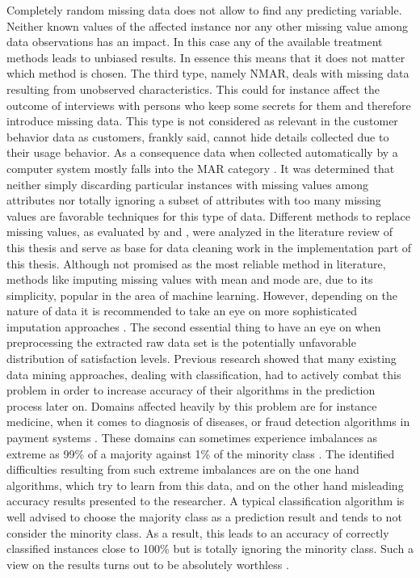 Completely random missing data does not allow to find any predicting variable. Neither known values of the affected instance nor any other missing value among data observations has an impact. In this case any of the available treatment methods leads to unbiased results. In essence this means that it does not matter which method is chosen. The third type, namely NMAR, deals with missing data resulting from unobserved characteristics. This could for instance affect the outcome of interviews with persons who keep some secrets for them and therefore introduce missing data. This type is not considered as relevant in the customer behavior data as customers, frankly said, cannot hide details collected due to their usage behavior. As a consequence data when collected automatically by a computer system mostly falls into the MAR category \cite{donders2006gentle}. It was determined that neither simply discarding particular instances with missing values among attributes nor totally ignoring a subset of attributes with too many missing values are favorable techniques for this type of data. Different methods to replace missing values, as evaluated by \cite{donders2006gentle} and \cite{batista2003analysis}, were analyzed in the literature review of this thesis and serve as base for data cleaning work in the implementation part of this thesis. Although not promised as the most reliable method in literature, methods like imputing missing values with mean and mode are, due to its simplicity, popular in the area of machine learning. However, depending on the nature of data it is recommended to take an eye on more sophisticated imputation approaches \cite{batista2003analysis}. 
\newline
\newline
The second essential thing to have an eye on when preprocessing the extracted raw data set is the potentially unfavorable distribution of satisfaction levels. Previous research showed that many existing data mining approaches, dealing with classification, had to actively combat this problem in order to increase accuracy of their algorithms in the prediction process later on. Domains affected heavily by this problem are for instance medicine, when it comes to diagnosis of diseases, or fraud detection algorithms in payment systems \cite{chawla2004special}. These domains can sometimes experience imbalances as extreme as 99\% of a majority against 1\% of the minority class \cite{he2009learning}. The identified difficulties resulting from such extreme imbalances are on the one hand algorithms, which try to learn from this data, and on the other hand misleading accuracy results presented to the researcher. A typical classification algorithm is well advised to choose the majority class as a prediction result and tends to not consider the minority class. As a result, this leads to an accuracy of correctly classified instances close to 100\% but is totally ignoring the minority class. Such a view on the results turns out to be absolutely worthless \cite{chawla2002smote} \cite{kubat1997addressing}. 
